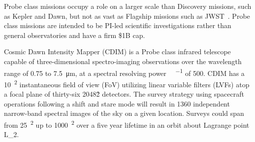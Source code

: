 \documentclass{ws-jai}
\begin{document}

Probe class missions occupy a role on a larger scale than Discovery missions, such as Kepler and Dawn, but not as vast as Flagship missions such as JWST~\cite{probeclasswp}.
Probe class missions are intended to be PI-led scientific investigations rather than general observatories and have a firm \$1B cap.

Cosmic Dawn Intensity Mapper (CDIM) is a Probe class infrared telescope capable of three-dimensional spectro-imaging observations over the wavelength range of 0.75 to \SI{7.5}{\micro\meter}, at a spectral resolving power \si{\Delta\lambda\per\lambda} of 500.
CDIM has a \SI{10}{\deg\squared} instantaneous field of view (FoV) utilizing linear variable filters (LVFs) atop a focal plane of thirty-six 2048\^{2} detectors.
The survey strategy using spacecraft operations following a shift and stare mode will result in 1360 independent narrow-band spectral images of the sky on a given location.
Surveys could span from \SI{25}{\deg\squared} up to \SI{1000}{\deg\squared} over a five year lifetime in an orbit about Lagrange point L_{2}\@.
\end{document}
